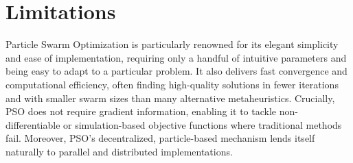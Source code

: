 {\section{Limitations}

Particle Swarm Optimization is particularly renowned for its elegant simplicity and ease of implementation, requiring only a handful of intuitive parameters and being easy to adapt to a particular problem. It also delivers fast convergence and computational efficiency, often finding high-quality solutions in fewer iterations and with smaller swarm sizes than many alternative \glspl{metaheuristic}. Crucially, PSO does not require gradient information, enabling it to tackle non-differentiable or simulation-based objective functions where traditional methods fail. Moreover, PSO’s decentralized, particle-based mechanism lends itself naturally to parallel and distributed implementations.




}
